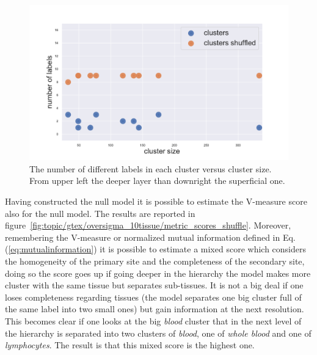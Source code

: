 \begin{figure}[htb!]
\begin{minipage}{0.45\textwidth}
    \end{minipage}
    \hspace{3mm}
    \begin{minipage}{0.45\textwidth}
    \includegraphics[width=0.9\linewidth]{pictures/topic/gtex/oversigma_10tissue/shuffledcluster_shuffle_label_size_l3_primary_site.pdf}
    \end{minipage}
\caption{The number of different labels in each cluster versus cluster size. From upper left the deeper layer than downright the superficial one.}
\label{fig:topic/gtex/oversigma_10tissue/shuffledcluster_shuffle_label_size_lall}
\end{figure}
\FloatBarrier
Having constructed the null model it is possible to estimate the V-measure score also for the null model. The results are reported in figure~\ref{fig:topic/gtex/oversigma_10tissue/metric_scores_shuffle}. 
Moreover, remembering the V-measure or normalized mutual information defined in Eq.(\ref{eq:mutualinformation}) it is possible to estimate a mixed score which considers the homogeneity of the primary site and the completeness of the secondary site, doing so the score goes up if going deeper in the hierarchy the model makes more cluster with the same tissue but separates sub-tissues. It is not a big deal if one loses completeness regarding tissues (the model separates one big cluster full of the same label into two small ones) but gain information at the next resolution. This becomes clear if one looks at the big \textit{blood} cluster that in the next level of the hierarchy is separated into two clusters of \textit{blood}, one of \textit{whole blood} and one of \textit{lymphocytes}. The result is that this mixed score is the highest one.
